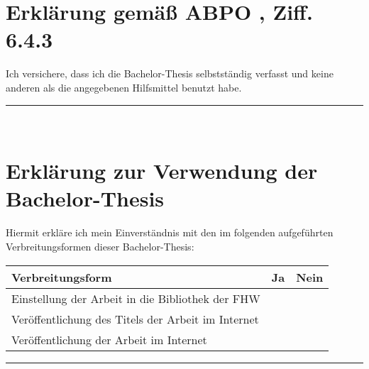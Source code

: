 \section*{Erklärung gemäß ABPO , Ziff. 6.4.3}

Ich versichere, dass ich die Bachelor-Thesis selbstständig verfasst und keine anderen als die angegebenen Hilfsmittel benutzt habe.


\vspace{3cm}
\makebox[.4\linewidth][l]{\thecity, \thedate}\hfill\rule{.4\linewidth}{0.5pt}\\
\makebox[.4\linewidth][l]{}\hfill\makebox[.4\linewidth][l]{\theauthor}

\vfill

\section*{Erklärung zur Verwendung der Bachelor-Thesis}

Hiermit erkläre ich mein Einverständnis mit den im folgenden aufgeführten Verbreitungsformen dieser Bachelor-Thesis:

\begin{tabularx}{\linewidth}{|Y|c|c|}
	\hline
	\textbf{Verbreitungsform} & \textbf{Ja} & \textbf{Nein}
	\\\hline
	Einstellung der Arbeit in die Bibliothek der FHW &  & 
	\\\hline
	Veröffentlichung des Titels der Arbeit im Internet &  & 
	\\\hline
	Veröffentlichung der Arbeit im Internet &  & 
	\\\hline
\end{tabularx}

\vspace{3cm}
\makebox[.4\linewidth][l]{\thecity, \thedate}\hfill\rule{.4\linewidth}{0.5pt}\\
\makebox[.4\linewidth][l]{}\hfill\makebox[.4\linewidth][l]{\theauthor}
